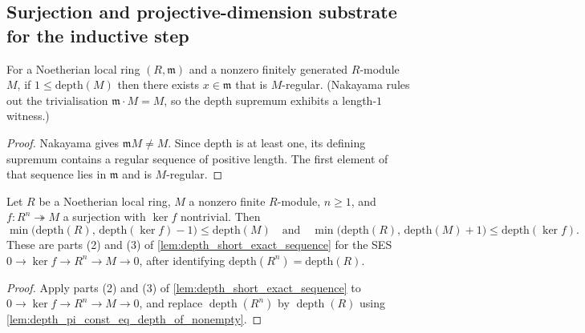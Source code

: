 \subsection{Surjection and projective-dimension substrate for the inductive step}
\label{subsec:ab_surjection_substrate}

\begin{lemma}
  \label{lem:exists_isSMulRegular_of_one_le_depth}
  For a Noetherian local ring \((R, \mathfrak m)\) and a nonzero finitely generated
  \(R\)-module \(M\), if \(1 \leq \text{depth}(M)\) then there exists \(x \in \mathfrak m\)
  that is \(M\)-regular. (Nakayama rules out the trivialisation
  \(\mathfrak m \cdot M = M\), so the depth supremum exhibits a length-\(1\) witness.)
\end{lemma}
\begin{proof}

  Nakayama gives \(\mathfrak mM\neq M\). Since depth is at least one,
  its defining supremum contains a regular sequence of positive length.
  The first element of that sequence lies in \(\mathfrak m\) and is
  \(M\)-regular.
\end{proof}

\begin{lemma}\leanok
  \label{lem:depth_ses_ineqs_of_surjection_finite_localRing}
  Let \(R\) be a Noetherian local ring, \(M\) a nonzero finite \(R\)-module, \(n \geq 1\),
  and \(f : R^n \twoheadrightarrow M\) a surjection with \(\ker f\) nontrivial. Then
  \[
    \min\bigl(\text{depth}(R),\, \text{depth}(\ker f) - 1\bigr) \leq \text{depth}(M)
    \quad\text{and}\quad
    \min\bigl(\text{depth}(R),\, \text{depth}(M) + 1\bigr) \leq \text{depth}(\ker f).
  \]
  These are parts (2) and (3) of \cref{lem:depth_short_exact_sequence} for the SES
  \(0 \to \ker f \to R^n \to M \to 0\), after identifying \(\text{depth}(R^n) = \text{depth}(R)\).
\end{lemma}
\begin{proof}

\leanok
  Apply parts (2) and (3) of
  \cref{lem:depth_short_exact_sequence} to
  \(0\to\ker f\to R^n\to M\to0\), and replace
  \(\operatorname{depth}(R^n)\) by \(\operatorname{depth}(R)\) using
  \cref{lem:depth_pi_const_eq_depth_of_nonempty}.
\end{proof}

